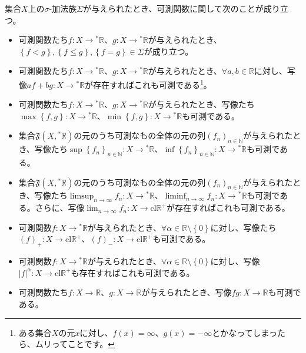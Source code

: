 \documentclass[dvipdfmx]{jsarticle}
\begin{document}
\begin{thm}\label{4.5.5.11}
集合$X$上の$\sigma$-加法族$\varSigma$が与えられたとき、可測関数に関して次のことが成り立つ。
\begin{itemize}
\item
  可測関数たち$f:X \rightarrow{}^{*}\mathbb{R}$、$g:X \rightarrow{}^{*}\mathbb{R}$が与えられたとき、$\left\{ f < g \right\},\left\{ f \leq g \right\},\left\{ f = g \right\} \in \varSigma$が成り立つ。
\item
  可測関数たち$f:X \rightarrow{}^{*}\mathbb{R}$、$g:X \rightarrow{}^{*}\mathbb{R}$が与えられたとき、$\forall a,b \in \mathbb{R}$に対し、写像$af + bg:X \rightarrow{}^{*}\mathbb{R}$が存在すればこれも可測である\footnote{ある集合$X$の元$x$に対し、$f(x) = \infty$、$g(x) = - \infty$とかなってしまったら、ムリってことです。}。
\item
  可測関数たち$f:X \rightarrow{}^{*}\mathbb{R}$、$g:X \rightarrow{}^{*}\mathbb{R}$が与えられたとき、写像たち$\max\left\{ f,g \right\}:X \rightarrow{}^{*}\mathbb{R}$、$\min\left\{ f,g \right\}:X \rightarrow{}^{*}\mathbb{R}$も可測である。
\item
  集合$\mathfrak{F}\left( X,{}^{*}\mathbb{R} \right)$の元のうち可測なもの全体の元の列$\left( f_{n} \right)_{n \in \mathbb{N}}$が与えられたとき、写像たち$\sup\left\{ f_{n} \right\}_{n \in \mathbb{N}}:X \rightarrow{}^{*}\mathbb{R}$、$\inf\left\{ f_{n} \right\}_{n \in \mathbb{N}}:X \rightarrow{}^{*}\mathbb{R}$も可測である。
\item
  集合$\mathfrak{F}\left( X,{}^{*}\mathbb{R} \right)$の元のうち可測なもの全体の元の列$\left( f_{n} \right)_{n \in \mathbb{N}}$が与えられたとき、写像たち$\limsup_{n \rightarrow \infty}f_{n}:X \rightarrow{}^{*}\mathbb{R}$、$\liminf_{n \rightarrow \infty}f_{n}:X \rightarrow{}^{*}\mathbb{R}$も可測である。さらに、写像$\lim_{n \rightarrow \infty}f_{n}:X \rightarrow \mathrm{cl}\mathbb{R}^{+}$が存在すればこれも可測である。
\item
  可測関数$f:X \rightarrow{}^{*}\mathbb{R}$が与えられたとき、$\forall\alpha \in \mathbb{R} \setminus \left\{ 0 \right\}$に対し、写像たち$(f)_{+}:X \rightarrow \mathrm{cl}\mathbb{R}^{+}$、$(f)_{-}:X \rightarrow \mathrm{cl}\mathbb{R}^{+}$も可測である。
\item
  可測関数$f:X \rightarrow{}^{*}\mathbb{R}$が与えられたとき、$\forall\alpha \in \mathbb{R} \setminus \left\{ 0 \right\}$に対し、写像$|f|^{\alpha}:X \rightarrow \mathrm{cl}\mathbb{R}^{+}$も存在すればこれも可測である。
\item
  可測関数たち$f:X \rightarrow \mathbb{R}$、$g:X \rightarrow \mathbb{R}$が与えられたとき、写像$fg:X \rightarrow \mathbb{R}$も可測である。
\end{itemize}
\end{thm}
\end{document}
